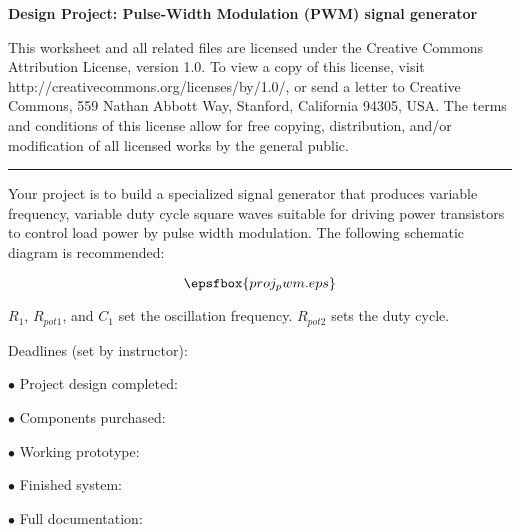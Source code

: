 
\centerline{\bf Design Project: Pulse-Width Modulation (PWM) signal generator} \bigskip 
 
This worksheet and all related files are licensed under the Creative Commons Attribution License, version 1.0.  To view a copy of this license, visit http://creativecommons.org/licenses/by/1.0/, or send a letter to Creative Commons, 559 Nathan Abbott Way, Stanford, California 94305, USA.  The terms and conditions of this license allow for free copying, distribution, and/or modification of all licensed works by the general public.

\bigskip 

\hrule

\vskip 10pt

Your project is to build a specialized signal generator that produces variable frequency, variable duty cycle square waves suitable for driving power transistors to control load power by pulse width modulation.  The following schematic diagram is recommended:

$$\epsfbox{proj_pwm.eps}$$

$R_1$, $R_{pot1}$, and $C_1$ set the oscillation frequency.  $R_{pot2}$ sets the duty cycle.

\vskip 10pt

\noindent
Deadlines (set by instructor):

\medskip
\item{$\bullet$} Project design completed: 
\item{$\bullet$} Components purchased:
\item{$\bullet$} Working prototype:
\item{$\bullet$} Finished system:
\item{$\bullet$} Full documentation:
\medskip



